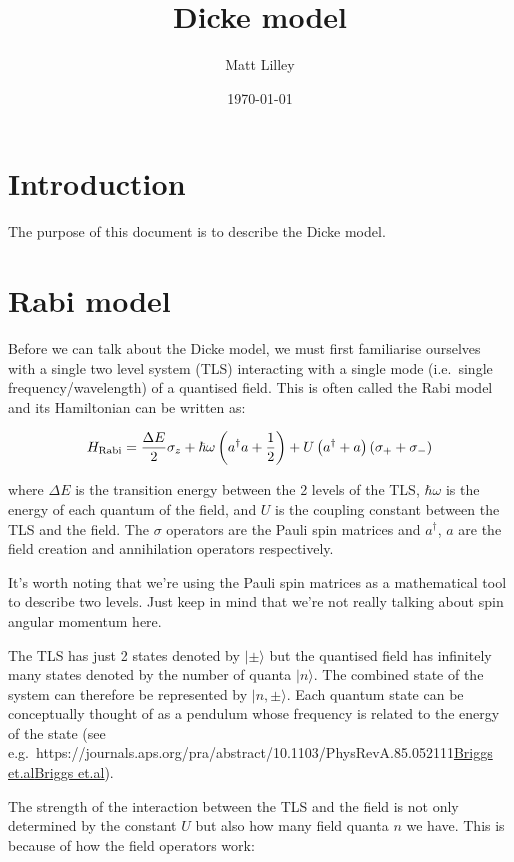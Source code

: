 \documentclass[
]{article}
\title{Dicke model}
\author{Matt Lilley}
\date{\today}  %
\let\oldhref\href
\renewcommand{\href}[2]{\ifx#1\urlprefix\oldhref{#1}{#2}\else\uline{\oldhref{#1}{#2}}\fi}
\renewcommand{\[}{\begin{equation}}
\renewcommand{\]}{\end{equation}}
\begin{document}
\maketitle

\section{Introduction}\label{introduction}

The purpose of this document is to describe the Dicke model.

\section{Rabi model}\label{rabi-model}

Before we can talk about the Dicke model, we must first familiarise
ourselves with a single two level system (TLS) interacting with a single
mode (i.e.~single frequency/wavelength) of a quantised field. This is
often called the Rabi model and its Hamiltonian can be written as:

\[
H_{\rm Rabi} = \frac{\Delta E}{2} \sigma_z + \hbar\omega\left(a^{\dagger}a +\frac{1}{2}\right) + U\left( a^{\dagger} + a \right)(\sigma_+ + \sigma_-)
\label{eq:rabiH}
\]

where \(\Delta E\) is the transition energy between the 2 levels of the
TLS, \(\hbar\omega\) is the energy of each quantum of the field, and
\(U\) is the coupling constant between the TLS and the field. The
\(\sigma\) operators are the Pauli spin matrices and \(a^{\dagger}\),
\(a\) are the field creation and annihilation operators respectively.

It's worth noting that we're using the Pauli spin matrices as a
mathematical tool to describe two levels. Just keep in mind that we're
not really talking about spin angular momentum here.

The TLS has just 2 states denoted by \(|\pm\rangle\) but the quantised
field has infinitely many states denoted by the number of quanta
\(|n\rangle\). The combined state of the system can therefore be
represented by \(|n, \pm\rangle\). Each quantum state can be
conceptually thought of as a pendulum whose frequency is related to the
energy of the state (see
e.g.~\href{https://journals.aps.org/pra/abstract/10.1103/PhysRevA.85.052111}{Briggs
et.al}).

The strength of the interaction between the TLS and the field is not
only determined by the constant \(U\) but also how many field quanta
\(n\) we have. This is because of how the field operators work:
\end{document}
